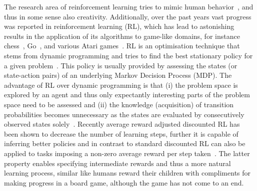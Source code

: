 \documentclass[envcountsame]{llncs}
\begin{document}
The research area of reinforcement learning tries to mimic human
behavior~\cite{schneckenreither2020average}, and thus in some sense also creativity. Additionally,
over the past years vast progress was reported in reinforcement learning (RL), which has lead to
astonishing results in the application of its algorithms to game-like domains, for instance
chess~\cite{Silver17_MasteringChessAndShogiBySelfPlayWithAGeneralReinforcementLearningAlgorithm},
Go~\cite{Silver16_MasteringTheGameOfGoWithDeepNeuralNetworksAndTreeSearch}, and various Atari
games~\cite{Mnih15_HumanlevelControlThroughDeepReinforcementLearningb}. RL is an optimisation
technique that stems from dynamic programming and tries to find the best stationary policy for a
given problem~\cite{sutton1998introduction}. This policy is usually provided by assessing the states
(or state-action pairs) of an underlying Markov Decision Process (MDP). The advantage of RL over
dynamic programming is that (i) the problem space is explored by an agent and thus only expectantly
interesting parts of the problem space need to be assessed and (ii) the knowledge (acquisition) of
transition probabilities becomes unnecessary as the states are evaluated by consecutively observed
states solely~\cite{sutton1998introduction}. Recently average reward adjusted discounted RL has been
shown to decrease the number of learning steps, further it is capable of inferring better policies
and in contrast to standard discounted RL can also be applied to tasks imposing a non-zero average
reward per step taken~\cite{schneckenreither2020average}. The latter property enables specifying
intermediate rewards and thus a more natural learning process, similar like humans reward their
children with compliments for making progress in a board game, although the game has not come to an
end.
\end{document}

